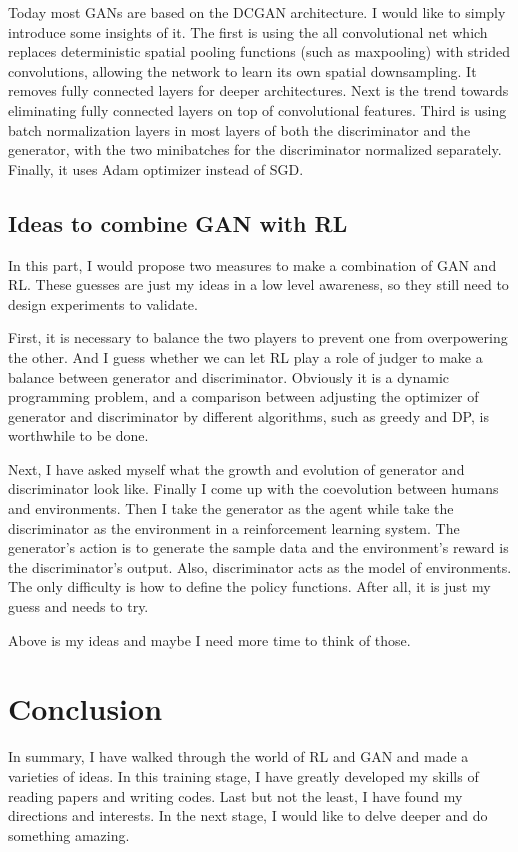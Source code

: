 \documentclass[10pt,twocolumn,letterpaper]{article}
\begin{document}
Today most GANs are based on the DCGAN architecture. I would like to simply introduce some insights of it. The first is 
using the all convolutional net  which replaces deterministic spatial pooling functions (such as maxpooling) with strided convolutions, allowing the network to learn its own spatial downsampling. It removes fully connected layers for deeper architectures. Next is the trend towards eliminating fully connected layers on top of convolutional features.  Third is using batch normalization layers in most layers of both the discriminator and the generator, with the two minibatches for the discriminator normalized separately. Finally, it uses Adam optimizer instead of SGD.

\subsection{Ideas to combine GAN with RL}

In this part, I would propose two measures to make a combination of GAN and RL. These guesses are just my ideas in a 
low level awareness, so they still need to design experiments to validate.

First, it is necessary to balance the two players to prevent one from overpowering the other. And I guess whether we can
let RL play a role of judger to make a balance between generator and discriminator. Obviously it is a dynamic 
programming problem, and a comparison between adjusting the optimizer of generator and discriminator by different
algorithms, such as greedy and DP, is worthwhile to be done. 

Next, I have asked myself what the growth and evolution of generator and discriminator look like. Finally I come up with
the coevolution between humans and environments. Then I take the generator as the agent while take the discriminator
as the environment in a reinforcement learning system. The generator's action is to generate the sample data and the 
environment's reward is the discriminator's output. Also, discriminator acts as the model of environments. The only 
difficulty is how to define the policy functions. After all, it is just my guess and needs to try.

Above is my ideas and maybe I need more time to think of those.

\section{Conclusion}

In summary, I have walked through the world of RL and GAN and made a varieties of ideas.  In this training stage, I have 
greatly developed my skills of reading papers and writing codes. Last but not the least, I have found my directions and 
interests. In the next stage, I would like to delve deeper and do something amazing.

{\small


}
\end{document}
